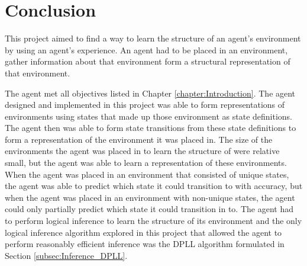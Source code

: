 






\chapter{Conclusion}
\label{chapter: Conclusion and Recommendations} 


This project aimed to find a way to learn the structure of an agent's environment by using an agent's experience.
An agent had to be placed in an environment, gather information about that environment form a structural representation of that environment.


The agent met all objectives listed in Chapter \ref{chapter:Introduction}. The agent designed and implemented in this project was able to form representations of environments using states that made up those environment as state definitions. The agent then was able to form state transitions from these state definitions to form a representation of the environment it was placed in. The size of the environments the agent was placed in to learn the structure of were relative small, but the agent was able to learn a representation of these environments. When the agent was placed in an environment that consisted of unique states, the agent was able to predict which state it could transition to with accuracy, but when the agent was placed in an environment with non-unique states, the agent could only partially predict which state it could transition in to. The agent had to perform logical inference to learn the structure of its environment and the only logical inference algorithm explored in this project that allowed the agent to perform reasonably efficient inference was the DPLL algorithm formulated in Section \ref{subsec:Inference_DPLL}.


